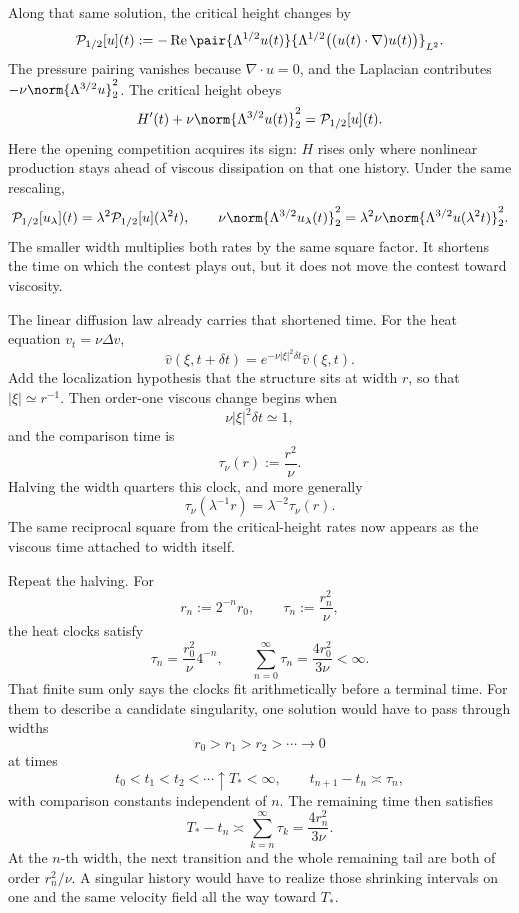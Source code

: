 Along that same solution, the critical height changes by
\[
  \mathcal P_{1/2}[u](t)
  :=
  -\operatorname{Re}
  \pair
    {\Lambda^{1/2}u(t)}
    {\Lambda^{1/2}\bigl((u(t)\cdot\nabla)u(t)\bigr)}_{L^2}.
\]
The pressure pairing vanishes because \(\nabla\cdot u=0\), and the Laplacian contributes \(-\nu\norm{\Lambda^{3/2}u}_2^2\). The critical height obeys
\[
  H'(t)
  +
  \nu\norm{\Lambda^{3/2}u(t)}_2^2
  =
  \mathcal P_{1/2}[u](t).
\]
Here the opening competition acquires its sign: \(H\) rises only where nonlinear production stays ahead of viscous dissipation on that one history. Under the same rescaling,
\[
  \mathcal P_{1/2}[u_\lambda](t)
  =
  \lambda^2\mathcal P_{1/2}[u](\lambda^2t),
  \qquad
  \nu\norm{\Lambda^{3/2}u_\lambda(t)}_2^2
  =
  \lambda^2\nu\norm{\Lambda^{3/2}u(\lambda^2t)}_2^2.
\]
The smaller width multiplies both rates by the same square factor. It shortens the time on which the contest plays out, but it does not move the contest toward viscosity.


The linear diffusion law already carries that shortened time. For the heat equation \(v_t=\nu\Delta v\),
\[
  \widehat v(\xi,t+\delta t)
  =
  e^{-\nu|\xi|^2\delta t}\widehat v(\xi,t).
\]
Add the localization hypothesis that the structure sits at width \(r\), so that \(|\xi|\simeq r^{-1}\). Then order-one viscous change begins when
\[
  \nu|\xi|^2\delta t\simeq1,
\]
and the comparison time is
\[
  \tau_\nu(r)
  :=
  \frac{r^2}{\nu}.
\]
Halving the width quarters this clock, and more generally
\[
  \tau_\nu(\lambda^{-1}r)
  =
  \lambda^{-2}\tau_\nu(r).
\]
The same reciprocal square from the critical-height rates now appears as the viscous time attached to width itself.


Repeat the halving. For
\[
  r_n:=2^{-n}r_0,
  \qquad
  \tau_n:=\frac{r_n^2}{\nu},
\]
the heat clocks satisfy
\[
  \tau_n
  =
  \frac{r_0^2}{\nu}4^{-n},
  \qquad
  \sum_{n=0}^{\infty}\tau_n
  =
  \frac{4r_0^2}{3\nu}
  <
  \infty.
\]
That finite sum only says the clocks fit arithmetically before a terminal time. For them to describe a candidate singularity, one \NavierStokes{} solution would have to pass through widths
\[
  r_0>r_1>r_2>\cdots\longrightarrow0
\]
at times
\[
  t_0<t_1<t_2<\cdots\uparrow T_*<\infty,
  \qquad
  t_{n+1}-t_n\asymp\tau_n,
\]
with comparison constants independent of \(n\). The remaining time then satisfies
\[
  T_*-t_n
  \asymp
  \sum_{k=n}^{\infty}\tau_k
  =
  \frac{4r_n^2}{3\nu}.
\]
At the \(n\)-th width, the next transition and the whole remaining tail are both of order \(r_n^2/\nu\). A singular history would have to realize those shrinking intervals on one and the same velocity field all the way toward \(T_*\).